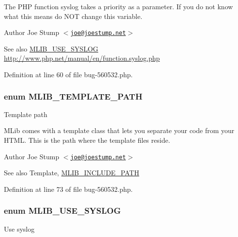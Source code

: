 \-The \-P\-H\-P function syslog takes a priority as a parameter. \-If you do not know what this means do \-N\-O\-T change this variable.

\begin{DoxyAuthor}{\-Author}
\-Joe \-Stump $<$\href{mailto:joe@joestump.net}{\tt joe@joestump.\-net}$>$ 
\end{DoxyAuthor}
\begin{DoxySeeAlso}{\-See also}
\hyperlink{bug-560532_8php_a02a03d86327e82cba1f4db2402f6dc30}{\-M\-L\-I\-B\-\_\-\-U\-S\-E\-\_\-\-S\-Y\-S\-L\-O\-G} \hyperlink{}{http\-://www.\-php.\-net/manual/en/function.\-syslog.\-php}
\end{DoxySeeAlso}


\-Definition at line 60 of file bug-\/560532.\-php.

\hypertarget{bug-560532_8php_a5788ff5311b6c1f774823861a02633fb}{
\subsubsection[{\-M\-L\-I\-B\-\_\-\-T\-E\-M\-P\-L\-A\-T\-E\-\_\-\-P\-A\-T\-H}]{\setlength{\rightskip}{0pt plus 5cm}enum {\bf \-M\-L\-I\-B\-\_\-\-T\-E\-M\-P\-L\-A\-T\-E\-\_\-\-P\-A\-T\-H}}}\label{bug-560532_8php_a5788ff5311b6c1f774823861a02633fb}
\-Template path

\-M\-Lib comes with a template class that lets you separate your code from your \-H\-T\-M\-L. \-This is the path where the template files reside.

\begin{DoxyAuthor}{\-Author}
\-Joe \-Stump $<$\href{mailto:joe@joestump.net}{\tt joe@joestump.\-net}$>$ 
\end{DoxyAuthor}
\begin{DoxySeeAlso}{\-See also}
\-Template, \hyperlink{bug-560532_8php_a1a2325154c8188acb8b9570d7b4d45de}{\-M\-L\-I\-B\-\_\-\-I\-N\-C\-L\-U\-D\-E\-\_\-\-P\-A\-T\-H} 
\end{DoxySeeAlso}


\-Definition at line 73 of file bug-\/560532.\-php.

\hypertarget{bug-560532_8php_a02a03d86327e82cba1f4db2402f6dc30}{
\subsubsection[{\-M\-L\-I\-B\-\_\-\-U\-S\-E\-\_\-\-S\-Y\-S\-L\-O\-G}]{\setlength{\rightskip}{0pt plus 5cm}enum {\bf \-M\-L\-I\-B\-\_\-\-U\-S\-E\-\_\-\-S\-Y\-S\-L\-O\-G}}}\label{bug-560532_8php_a02a03d86327e82cba1f4db2402f6dc30}
\-Use syslog

